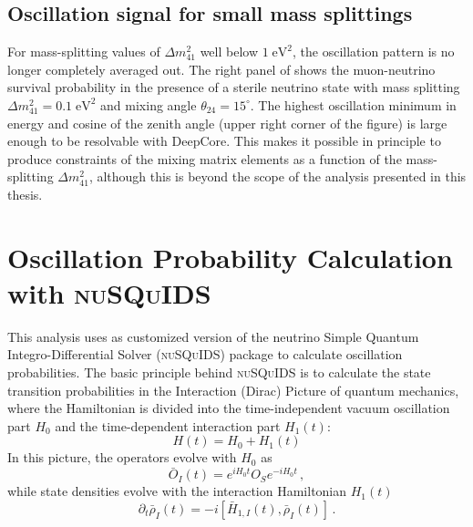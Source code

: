 \subsection{Oscillation signal for small mass splittings}
For mass-splitting values of $\Delta m^2_{41}$ well below $1\;\mathrm{eV^2}$, the oscillation pattern is no longer completely averaged out.
The right panel of  shows the muon-neutrino survival probability in the presence of a sterile neutrino state with mass splitting $\Delta m^2_{41}=0.1\;\mathrm{eV^2}$ and mixing angle $\theta_{24}=15^\circ$.
The highest oscillation minimum in energy and cosine of the zenith angle (upper right corner of the figure) is large enough to be resolvable with DeepCore.
This makes it possible in principle to produce constraints of the mixing matrix elements as a function of the mass-splitting $\Delta m^2_{41}$, although this is beyond the scope of the analysis presented in this thesis.

\section{Oscillation Probability Calculation with \textsc{nuSQuIDS}}
\label{sec:nusquids}

This analysis uses as customized version of the neutrino Simple Quantum Integro-Differential Solver (\textsc{nuSQuIDS})\cite{squids, nusquids} package to calculate oscillation probabilities.
The basic principle behind \textsc{nuSQuIDS} is to calculate the state transition probabilities in the Interaction (Dirac) Picture of quantum mechanics, where the Hamiltonian is divided into the time-independent vacuum oscillation part $H_0$ and the time-dependent interaction part $ H_1(t)$:
\begin{equation}
    H(t) = H_0 + H_1(t)
\end{equation}
In this picture, the operators evolve with $ H_0$ as
\begin{equation}
\bar{O}_I(t)=e^{iH_0t}O_Se^{-iH_0t}\,,
\end{equation}
while state densities evolve with the interaction Hamiltonian $ H_1(t)$
\begin{equation}
\partial_t\bar{\rho}_I(t)=-i[\bar{H}_{1, I}(t), \bar{\rho}_I(t)]\,.
\end{equation}

